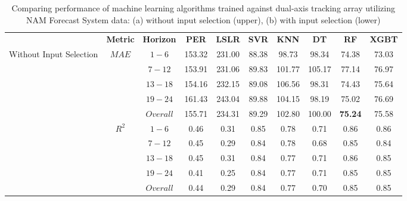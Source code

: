 \begin{table}[h]
\begin{center}
        \caption[Comparing performance of machine learning algorithms trained against dual-axis tracking array using NAM Forecast System data, with and without input selection.]{Comparing performance of machine learning algorithms trained against dual-axis tracking array utilizing NAM Forecast System data: (a) without input selection (upper), (b) with input selection (lower)}
    \label{Tab:fs_array_a}
    \begin{tabular}{@{}p{5.3em}ccccccccc@{}}
    \toprule
    & \textbf{Metric} & \textbf{Horizon} & \textbf{PER} & \textbf{LSLR} & \textbf{SVR} & \textbf{KNN} & \textbf{DT} & \textbf{RF} & \textbf{XGBT} \\ \cmidrule(l){1-10} 
    \multirow{10}{5em}{Without Input Selection} & \multirow{5}{*}{$MAE$} & $1 - 6$ & 153.32 & 231.00 & 88.38 & 98.73 & 98.34 & 74.38 & 73.03 \\
                                              &                   & $7 - 12$ & 153.91 & 231.06 & 89.83 & 101.77 & 105.17 & 77.14 & 76.97 \\
                                              &                   & $13 - 18$ & 154.16 & 232.15 & 89.08 & 106.56 & 98.31 & 74.43 & 75.64 \\
                                              &                   & $19 - 24$ & 161.43 & 243.04 & 89.88 & 104.15 & 98.19 & 75.02 & 76.69 \\
                                              &                   & $Overall$ & 155.71 & 234.31 & 89.29 & 102.80 & 100.00 & \textbf{75.24} & 75.58 \\ \cmidrule(lr){2-10}
                                              & \multirow{5}{*}{$R^2$} & $1 - 6$ & 0.46 & 0.31 & 0.85 & 0.78 & 0.71 & 0.86 & 0.86 \\
                                              &                   & $7 - 12$ & 0.45 & 0.29 & 0.84 & 0.78 & 0.68 & 0.85 & 0.84 \\
                                              &                   & $13 - 18$ & 0.45 & 0.31 & 0.84 & 0.77 & 0.71 & 0.86 & 0.85 \\
                                              &                   & $19 - 24$ & 0.41 & 0.25 & 0.84 & 0.77 & 0.71 & 0.85 & 0.85 \\
                                              &                   & $Overall$ & 0.44 & 0.29 & 0.84 & 0.77 & 0.70 & 0.85 & 0.85 \\ 

\end{tabular}
\end{center}
\end{table}
